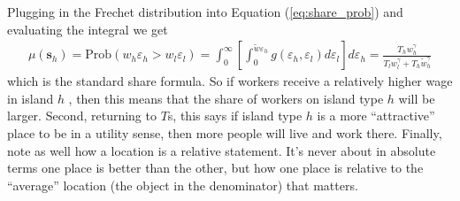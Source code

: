 \documentclass[pdftex,12pt]{article}
\begin{document}
\medskip
\noindent Plugging in the Frechet distribution into Equation (\ref{eq:share_prob}) and evaluating the integral we get
\begin{align}
\mu(\textbf{s}_h) = \mathrm{Prob}\left(w_h \varepsilon_h >  w_l\varepsilon_l\right) = \int_0^{\infty}\left[\int_0^{\tilde w\varepsilon_h}g(\varepsilon_h,\varepsilon_l)d\varepsilon_l\right]d\varepsilon_h = \frac{T_h w_h ^{\gamma}}{T_lw_l^{\gamma} + T_h \tilde w_h ^{\gamma}}
\label{eq:share_formula}
\end{align}
which is the standard share formula. So if workers receive a relatively higher wage in island $h$ , then this means that the share of workers on island type $h$ will be larger. Second, returning to $T$s, this says if island type $h$ is a more ``attractive'' place to be in a utility sense, then more people will live and work there. Finally, note as well how a location is a relative statement. It's never about in absolute terms one place is better than the other, but how one place is relative to the ``average'' location (the object in the denominator) that matters.
\end{document}
